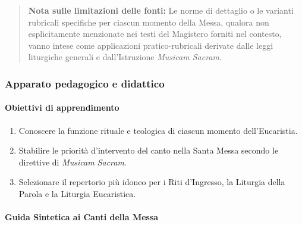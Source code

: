 \documentclass[12pt,a4paper]{article}
\begin{document}
	\begin{quote}
		\textbf{Nota sulle limitazioni delle fonti:} Le norme di dettaglio o le varianti rubricali specifiche per ciascun momento della Messa, qualora non esplicitamente menzionate nei testi del Magistero forniti nel contesto, vanno intese come applicazioni pratico-rubricali derivate dalle leggi liturgiche generali e dall'Istruzione \emph{Musicam Sacram}.
	\end{quote}
	
	\subsubsection{Apparato pedagogico e didattico}\label{apparato-pedagogico-e-didattico-6}
	
	\paragraph{Obiettivi di apprendimento}\label{obiettivi-di-apprendimento-6}
	
	\begin{enumerate}[label=\arabic*.,leftmargin=*]
		\item Conoscere la funzione rituale e teologica di ciascun momento dell'Eucaristia.
		\item Stabilire le priorità d'intervento del canto nella Santa Messa secondo le direttive di \emph{Musicam Sacram}.
		\item Selezionare il repertorio più idoneo per i Riti d'Ingresso, la Liturgia della Parola e la Liturgia Eucaristica.
	\end{enumerate}
	
	\paragraph{Guida Sintetica ai Canti della Messa}\label{guida-sintetica-ai-canti-della-messa}
	
\end{document}
